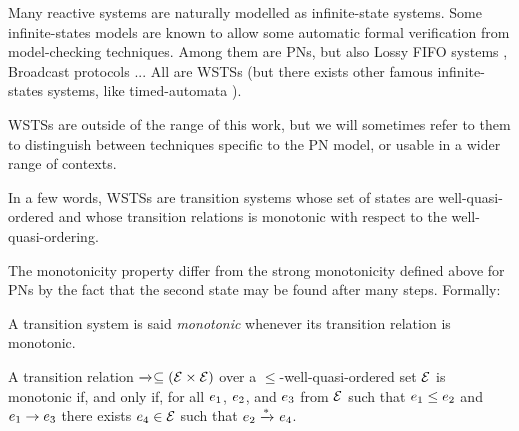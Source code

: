 Many reactive systems are naturally modelled as infinite-state systems.
Some infinite-states models are known to allow some automatic formal verification from model-checking techniques.
Among them are \acp{PN}, but also Lossy FIFO systems \citep{Abdulla98}, Broadcast protocols \citep{Emerson98}...
All are \acp{WSTS} (but there exists other famous infinite-states systems, like timed-automata \citep{Alur94}).

\acp{WSTS} are outside of the range of this work, but we will sometimes refer to them to distinguish between techniques specific to the \ac{PN} model, or usable in a wider range of contexts.

In a few words, \acp{WSTS} are transition systems whose set of states are well-quasi-ordered and whose transition relations is monotonic with respect to the well-quasi-ordering.

The monotonicity property differ from the strong monotonicity defined above for \acp{PN} by the fact that the second state may be found after many steps. Formally:
\begin{defi}[Monotonicity]
  \label{defi:monotonicity}
  A transition system is said \emph{monotonic} whenever its transition relation is monotonic.

  A transition relation $\xrightarrow{}_{} \subseteq (\mathcal{E} \times \mathcal{E})$ over a $\leq$-well-quasi-ordered set $\mathcal{E}$ is monotonic if, and only if, for all $e_1$, $e_2$, and $e_3$ from $\mathcal{E}$ such that $e_1 \leq e_2$ and $e_1 \rightarrow e_3$ there exists $e_4 \in \mathcal{E}$ such that $e_2 \xrightarrow{*}_{} e_4$.
\end{defi}

